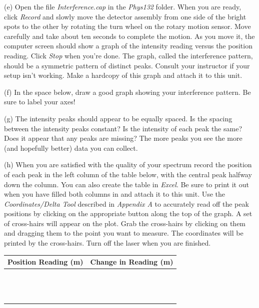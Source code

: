 (e) Open the file {\it Interference.cap} in the {\it Phys132} folder. 
When you are ready, click {\it Record} and slowly move the
detector assembly from one side of the bright spots to the other by rotating the turn wheel on the rotary motion
sensor. Move carefully and take about ten seconds to complete the motion. As you move it, the computer screen
should show a graph of the intensity reading versus the position reading. Click {\it Stop} when you’re done. The
graph, called the interference pattern, should be a symmetric pattern of distinct peaks. Consult your instructor
if your setup isn’t working.
Make a hardcopy of this graph and attach it to this unit.

(f) In the space below, draw a good graph showing your interference pattern. Be sure to label your axes!
\vspace{25mm}

(g) The intensity peaks should appear to be equally spaced. 
Is the spacing between the intensity peaks constant? Is the intensity
of each peak the same? Does it appear that any peaks are missing?
The more peaks you see the more (and hopefully better) data you can collect.
\vspace{12mm}

(h) When you are satisfied with the quality of your spectrum record the 
position of each peak in the left column of the table below, with the central 
peak halfway down the column. You can also create the table in {\it Excel}.
Be sure to print it out when you have filled both columns in and attach it to this
unit.
Use the {\it Coordinates/Delta Tool} 
described in {\it Appendix A} to accurately read off 
the peak positions by clicking on the appropriate button along the top of the 
graph. A set of cross-hairs will appear on the plot. Grab the cross-hairs by 
clicking on them and dragging them to the point you want to measure.
The coordinates will be printed by the cross-hairs.
Turn off the laser when you are finished.

\vspace{0.3cm}
{\centering \begin{tabular}{|c|c|}
\hline 
Position Reading (m)&
Change in Reading (m)\\
\hline
\hline 
&
\\
\hline 
&
\\
\hline 
&
\\
\hline 
&
\\
\hline 
&
\\
\hline 
&
\\
\hline 
&
\\
\hline
&
\\
\hline
&
\\
\hline
&
\\
\hline
&
\\
\hline
&
\\
\hline
&
\\
\hline
\end{tabular}\par}
\vspace{0.3cm}

